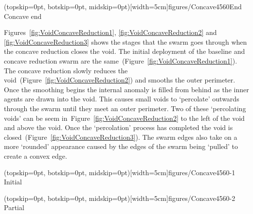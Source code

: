 \documentclass{ieeeaccess}
\begin{document}
\Figure[t!](topskip=0pt, botskip=0pt, midskip=0pt)[width=5cm]{figures/Concave4560End}
{Concave end\label{fig:ConcaveEndPoint4560}}


Figures~\ref{fig:VoidConcaveReduction1}, \ref{fig:VoidConcaveReduction2} and \ref{fig:VoidConcaveReduction3} shows the stages that the swarm goes through when the concave reduction closes the void. The initial deployment of the baseline and concave reduction swarm are the same~(Figure~\ref{fig:VoidConcaveReduction1}). The concave reduction slowly reduces the void~(Figure~\ref{fig:VoidConcaveReduction2}) and smooths the outer perimeter. Once the smoothing begins the internal anomaly is filled from behind as the inner agents are drawn into the void. This causes small voids to `percolate' outwards through the swarm until they meet an outer perimeter. Two of these `percolating voids' can be seem in~Figure~\ref{fig:VoidConcaveReduction2} to the left of the void and above the void. Once the `percolation' process has completed the void is closed~(Figure~\ref{fig:VoidConcaveReduction3}). The swarm edges also take on a more `rounded' appearance caused by the edges of the swarm being `pulled' to create a convex edge.

\Figure[t!](topskip=0pt, botskip=0pt, midskip=0pt)[width=5cm]{figures/Concave4560-1}
{Initial\label{fig:VoidConcaveReduction1}}


\Figure[t!](topskip=0pt, botskip=0pt, midskip=0pt)[width=5cm]{figures/Concave4560-2}
{Partial\label{fig:VoidConcaveReduction2}}

\end{document}
